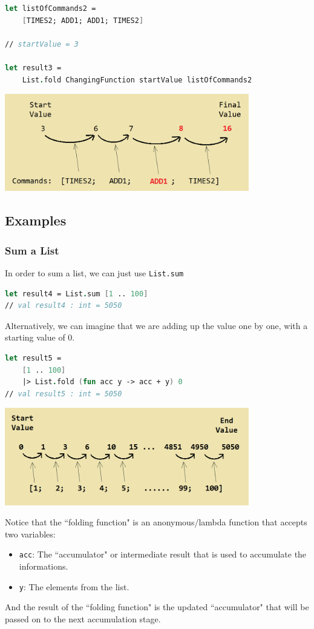 \documentclass[12pt]{article}
\begin{document}
\begin{lstlisting}[language=FSharp]
let listOfCommands2 = 
    [TIMES2; ADD1; ADD1; TIMES2]

// startValue = 3

let result3 =
    List.fold ChangingFunction startValue listOfCommands2
\end{lstlisting}
\begin{center}
\includegraphics[width=0.8\textwidth]{pictures/picture33.png}
\end{center}

\pagebreak

\subsection{Examples}

\subsubsection*{Sum a List}

In order to sum a list, we can just use \texttt{List.sum}
\begin{lstlisting}[language=FSharp]
let result4 = List.sum [1 .. 100]
// val result4 : int = 5050
\end{lstlisting}
Alternatively, we can imagine that we are adding up the value one by one, with a starting value of $0$.

\begin{lstlisting}[language=FSharp]
let result5 = 
    [1 .. 100]
    |> List.fold (fun acc y -> acc + y) 0
// val result5 : int = 5050
\end{lstlisting}
\begin{center}
\includegraphics[width=0.8\textwidth]{pictures/picture34.png}
\end{center}
Notice that the ``folding function" is an anonymous/lambda function that accepts two variables:
\begin{itemize}
\item \texttt{acc}: The ``accumulator" or intermediate result that is used to accumulate the informations.
\item \texttt{y}: The elements from the list.
\end{itemize}
And the result of the ``folding function" is the updated ``accumulator" that will be passed on to the next accumulation stage.
\end{document}
